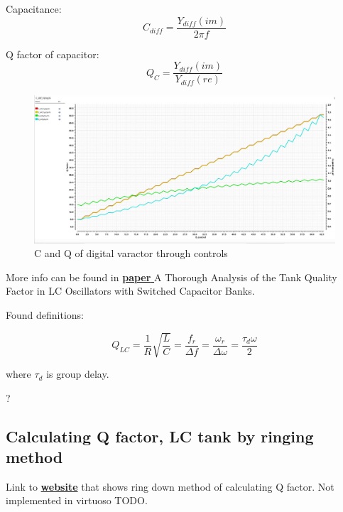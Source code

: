 \documentclass{article}
\begin{document}
Capacitance:
\begin{equation}
	C_{diff} = \dfrac{Y_{diff} (im)}{2\pi f}
\end{equation}

Q factor of capacitor:
\begin{equation}
	Q_C = \dfrac{Y_{diff} (im)}{ Y_{diff} (re)}
\end{equation}

\begin{figure}[h!]
	\includegraphics[width=\linewidth]{Figures/Dvaractor.png}
	\caption{C and Q of digital varactor through controls}
	\label{fig:dvaracator}
\end{figure}

More info can be found in  \href{https://ieeexplore.ieee.org/abstract/document/5537949}{\textbf{paper }} A Thorough Analysis of the Tank Quality Factor in LC Oscillators with Switched Capacitor Banks.

Found definitions:

\begin{equation}
	Q_{LC} = \dfrac{1}{R}\sqrt{\dfrac{L}{C}} = \frac{f_r}{\Delta f} = \frac{\omega _r}{\Delta \omega} = \dfrac{\tau _d \omega}{2}
\end{equation}

where $\tau _d$ is group delay.

\begin{question}
	?
\end{question}

\subsection{Calculating Q factor‚ LC tank by ringing method}

Link to \href{https://www.giangrandi.ch/electronics/ringdownq/ringdownq.shtml}{\textbf{website}} that shows ring down method of calculating Q factor. Not implemented in virtuoso TODO.
\end{document}
